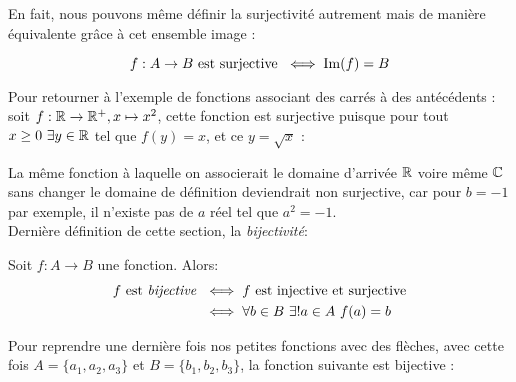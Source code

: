 \noindent En fait, nous pouvons même définir la surjectivité autrement mais de manière équivalente grâce à cet ensemble image :

\begin{boxdef}
$$f: A \to B \text{ est surjective } \iff \operatorname{Im}(f) = B
$$
\end{boxdef}

\noindent Pour retourner à l'exemple de fonctions associant des carrés à des antécédents : soit $f : \mathbb{R} \to \mathbb{R}^+, x \mapsto x^2$, cette fonction est surjective puisque pour tout $x \geq 0 \ \exists y \in \mathbb{R}$ tel que $f(y) = x$, et ce $y = \sqrt{x}$ :
\begin{center}
\end{center}
La même fonction à laquelle on associerait le domaine d'arrivée $\mathbb{R}$ voire même $\mathbb{C}$ sans changer le domaine de définition deviendrait non surjective, car pour $b = -1$ par exemple, il n'existe pas de $a$ réel tel que $a^2 = -1$.\\

\noindent Dernière définition de cette section, la \textit{bijectivité}:
\begin{boxdef}
Soit $f: A \to B$ une fonction. Alors:
\begin{align*}
    f \text{ est \textit{bijective} } &\iff f \text{ est injective et surjective}\\
    &\iff \forall b \in B\ \exists! a \in A \ f(a) = b
\end{align*}
\end{boxdef}
Pour reprendre une dernière fois nos petites fonctions avec des flèches, avec cette fois $A = \{a_1, a_2, a_3\}$ et $B = \{b_1, b_2, b_3\}$, la fonction suivante est bijective :

